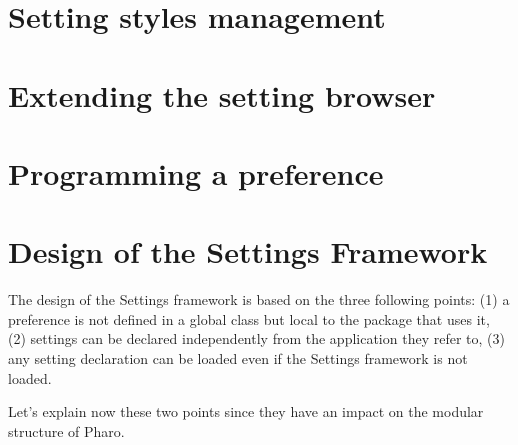 \documentclass[a4paper,10pt,twoside]{book}
\begin{document}
%
%					
%


\section{Setting styles management}
\label{sec:SettingStylesManagement}

\section{Extending the setting browser}
\label{sec:ExtendingTheSettingsBrowser}

\section{Programming a preference}
\label{sec:ProgrammingAPreference}

\section{Design of the Settings Framework}
The design of the Settings framework is based on the three following points: (1) a preference is not defined in a global class but local to the package that uses it, (2) settings can be declared independently from the application they refer to, (3) any setting declaration can be loaded even if the Settings framework is not loaded. 

Let's explain now these two points since they have an impact on the modular structure of Pharo. 
\end{document}
